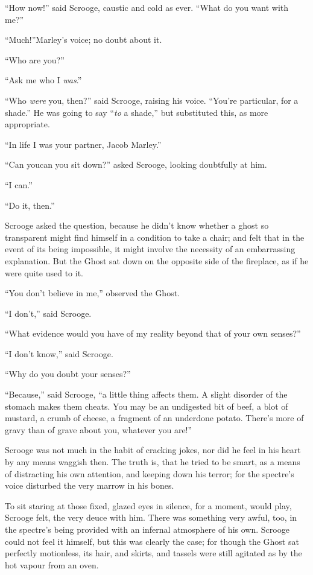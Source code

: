 \documentclass[paper=5.5in:8.5in,BCOR=5mm,twoside,DIV=calc,12pt,usegeometry]{scrbook} %
\begin{document}
\enquote{How now!} said Scrooge, caustic and cold as ever. \enquote{What do you want with me?}

\enquote{Much!}\textemdash Marley's voice; no doubt about it.

\enquote{Who are you?}

\enquote{Ask me who I \textit{was}.}

\enquote{Who \textit{were} you, then?} said Scrooge, raising his voice. \enquote{You're particular, for a shade.} He was going to say \enquote{\textit{to} a shade,} but substituted this, as more appropriate.

\enquote{In life I was your partner, Jacob Marley.}

\enquote{Can you\textemdash can you sit down?} asked Scrooge, looking doubtfully at him.

\enquote{I can.}

\enquote{Do it, then.}

Scrooge asked the question, because he didn't know whether a ghost so transparent might find himself in a condition to take a chair; and felt that in the event of its being impossible, it might involve the necessity of an embarrassing explanation. But the Ghost sat down on the opposite side of the fireplace, as if he were quite used to it.

\enquote{You don't believe in me,} observed the Ghost.

\enquote{I don't,} said Scrooge.

\enquote{What evidence would you have of my reality beyond that of your own senses?}

\enquote{I don't know,} said Scrooge.

\enquote{Why do you doubt your senses?}

\enquote{Because,} said Scrooge, \enquote{a little thing affects them. A slight disorder of the stomach makes them cheats. You may be an undigested bit of beef, a blot of mustard, a crumb of cheese, a fragment of an underdone potato. There's more of gravy than of grave about you, whatever you are!}

Scrooge was not much in the habit of cracking jokes, nor did he feel in his heart by any means waggish then. The truth is, that he tried to be smart, as a means of distracting his own attention, and keeping down his terror; for the spectre's voice disturbed the very marrow in his bones.

To sit staring at those fixed, glazed eyes in silence, for a moment, would play, Scrooge felt, the very deuce with him. There was something very awful, too, in the spectre's being provided with an infernal atmosphere of his own. Scrooge could not feel it himself, but this was clearly the case; for though the Ghost sat perfectly motionless, its hair, and skirts, and tassels were still agitated as by the hot vapour from an oven.
\end{document}
